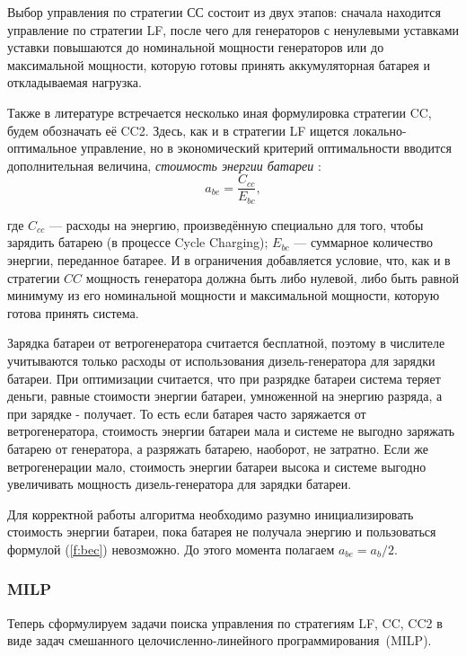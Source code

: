 Выбор управления по стратегии СС состоит из двух этапов: сначала находится управление по стратегии LF, после чего для генераторов с ненулевыми уставками уставки повышаются до номинальной мощности генераторов или до максимальной мощности, которую готовы принять аккумуляторная батарея и откладываемая нагрузка.

Также в литературе \cite[10]{Aziz2019} встречается несколько иная формулировка стратегии CC, будем обозначать её CC2. 
Здесь, как и в стратегии LF ищется локально-оптимальное управление, но в экономический критерий оптимальности вводится дополнительная величина, \textit{стоимость энергии батареи} \cite{bec}:
\begin{equation}\label{f:bec}
    a_{be} = \frac{C_{cc}}{E_{bc}},
\end{equation}

где $C_{cc}$ --- расходы на энергию, произведённую специально для того, чтобы зарядить батарею (в процессе Cycle Charging); $E_{bc}$ --- суммарное количество энергии, переданное батарее.
И в ограничения добавляется условие, что, как и в стратегии $CC$ мощность генератора должна быть либо нулевой, либо быть равной минимуму из его номинальной мощности и максимальной мощности, которую готова принять система.

Зарядка батареи от ветрогенератора считается бесплатной, поэтому в числителе учитываются только расходы от использования дизель-генератора для зарядки батареи.
При оптимизации считается, что при разрядке батареи система теряет деньги, равные стоимости энергии батареи, умноженной на энергию разряда, а при зарядке - получает.
То есть если батарея часто заряжается от ветрогенератора, стоимость энергии батареи мала и системе не выгодно заряжать батарею от генератора, а разряжать батарею, наоборот, не затратно.
Если же ветрогенерации мало, стоимость энергии батареи высока и системе выгодно увеличивать мощность дизель-генератора для зарядки батареи.

Для корректной работы алгоритма необходимо разумно инициализировать стоимость энергии батареи, пока батарея не получала энергию и пользоваться формулой (\ref{f:bec}) невозможно.
До этого момента полагаем $a_{be} = a_b / 2$.

\subsubsection{MILP}
Теперь сформулируем задачи поиска управления по стратегиям LF, CC, CC2 в виде задач смешанного целочисленно-линейного программирования~(MILP).

